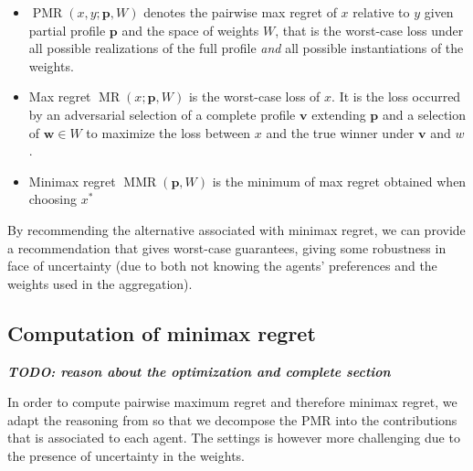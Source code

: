 \documentclass[12pt]{article}
\newcommand{\profile}{\textbf{v}}%
\newcommand{\pprofile}{\textbf{p}}%
\newcommand{\w}{\textbf{w}}%
\DeclareMathOperator{\PMR}{PMR}
\DeclareMathOperator{\MR}{MR}
\DeclareMathOperator{\MMR}{MMR}
\begin{document}
\begin{itemize}
 \item $\PMR(x,y;\pprofile,W)$ denotes the pairwise max regret of $x$ relative to $y$ given partial profile $\pprofile$ and the space of weights $W$, that is the worst-case loss under all possible realizations of the full profile {\em and} all possible instantiations of the weights.
 \item Max regret $\MR(x;\pprofile,W)$ is the worst-case loss of $x$. It is the loss occurred by an adversarial selection of a complete profile $\profile$ extending $\pprofile$ and a selection of $\w \in W$ to maximize the loss between $x$ and the true winner under $\profile$ and $w$.
 \item Minimax regret $\MMR(\pprofile,W)$ is the minimum of max regret obtained when choosing $x^*$
\end{itemize}
By recommending the alternative associated with minimax regret, we can provide a recommendation that gives worst-case guarantees, giving some robustness in face of uncertainty (due to both not knowing the agents' preferences and the weights used in the aggregation).

\subsection{Computation of minimax regret}
{\bf \em TODO: reason about the optimization and complete section}

In order to compute pairwise maximum regret and therefore minimax regret, we adapt the reasoning from \cite{Lu2011} so that we decompose the PMR into the contributions that is associated to each agent.
The settings is however more challenging due to the presence of uncertainty in the weights.
\end{document}
